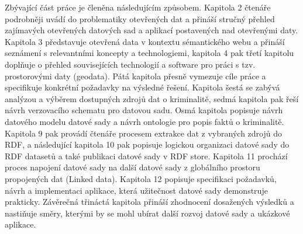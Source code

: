 Zbývající část práce je členěna následujícím způsobem. Kapitola 2 čtenáře podrobněji uvádí do problematiky otevřených dat a přináší stručný přehled zajímavých otevřených datových sad a aplikací postavených nad otevřenými daty. Kapitola 3 představuje otevřená data v kontextu sémantického webu a přináší seznámení s relevantními koncepty a technologiemi, kapitola 4 pak třetí kapitolu doplňuje o přehled souvisejících technologií a software pro práci s tzv. prostorovými daty (geodata). Pátá kapitola přesně vymezuje cíle práce a specifikuje konkrétní požadavky na výsledné řešení. Kapitola šestá se zabývá analýzou a výběrem dostupných zdrojů dat o kriminalitě, sedmá kapitola pak řeší návrh verzovacího schematu pro datovou sadu. Osmá kapitola popisuje návrh datového modelu datové sady a návrh ontologie pro popis faktů o kriminalitě. Kapitola 9 pak provádí čtenáře procesem extrakce dat z vybraných zdrojů do RDF, a následující kapitola 10 pak popisuje logickou organizaci datové sady do RDF datasetů a také publikaci datové sady v RDF store. Kapitola 11 prochází proces napojení datové sady na další datové sady z globálního prostoru propojených dat (Linked data). Kapitola 12 popisuje specifikaci požadavků, návrh a implementaci aplikace, která užitečnost datové sady demonstruje prakticky. Závěrečná třináctá kapitola přináší zhodnocení dosažených výsledků a nastiňuje směry, kterými by se mohl ubírat další rozvoj datové sady a ukázkové aplikace.